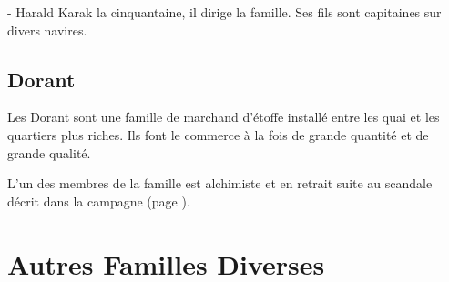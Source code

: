 - Harald Karak la cinquantaine, il dirige la famille. Ses fils sont capitaines 
sur divers navires. 

\subsection*{Dorant}

Les Dorant sont une famille de marchand d'étoffe installé entre les quai et
les quartiers plus riches. Ils font le commerce à la fois de grande 
quantité et de grande qualité. 

L'un des membres de la famille est alchimiste et en retrait suite au 
scandale décrit dans la campagne (page \pageref{TAS-Magie}).

\section{Autres Familles Diverses}

